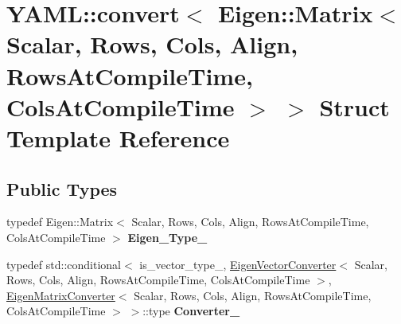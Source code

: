 \hypertarget{structYAML_1_1convert_3_01Eigen_1_1Matrix_3_01Scalar_00_01Rows_00_01Cols_00_01Align_00_01RowsAtC8665abb6da4eb6935869b0ee422ba9ce}{}\section{Y\+A\+ML\+:\+:convert$<$ Eigen\+:\+:Matrix$<$ Scalar, Rows, Cols, Align, Rows\+At\+Compile\+Time, Cols\+At\+Compile\+Time $>$ $>$ Struct Template Reference}
\label{structYAML_1_1convert_3_01Eigen_1_1Matrix_3_01Scalar_00_01Rows_00_01Cols_00_01Align_00_01RowsAtC8665abb6da4eb6935869b0ee422ba9ce}
\subsection*{Public Types}
\begin{DoxyCompactItemize}
\item 
\mbox{\label{structYAML_1_1convert_3_01Eigen_1_1Matrix_3_01Scalar_00_01Rows_00_01Cols_00_01Align_00_01RowsAtC8665abb6da4eb6935869b0ee422ba9ce_a798e760d2b03324cecd1da2db5680c5a}} 
typedef Eigen\+::\+Matrix$<$ Scalar, Rows, Cols, Align, Rows\+At\+Compile\+Time, Cols\+At\+Compile\+Time $>$ {\bfseries Eigen\+\_\+\+Type\+\_\+}
\item 
\mbox{\label{structYAML_1_1convert_3_01Eigen_1_1Matrix_3_01Scalar_00_01Rows_00_01Cols_00_01Align_00_01RowsAtC8665abb6da4eb6935869b0ee422ba9ce_a88ccaf7da608e0afffffd7248f54b75a}} 
typedef std\+::conditional$<$ is\+\_\+vector\+\_\+type\+\_\+, \hyperlink{structYAML_1_1EigenVectorConverter}{Eigen\+Vector\+Converter}$<$ Scalar, Rows, Cols, Align, Rows\+At\+Compile\+Time, Cols\+At\+Compile\+Time $>$, \hyperlink{structYAML_1_1EigenMatrixConverter}{Eigen\+Matrix\+Converter}$<$ Scalar, Rows, Cols, Align, Rows\+At\+Compile\+Time, Cols\+At\+Compile\+Time $>$ $>$\+::type {\bfseries Converter\+\_\+}
\end{DoxyCompactItemize}
